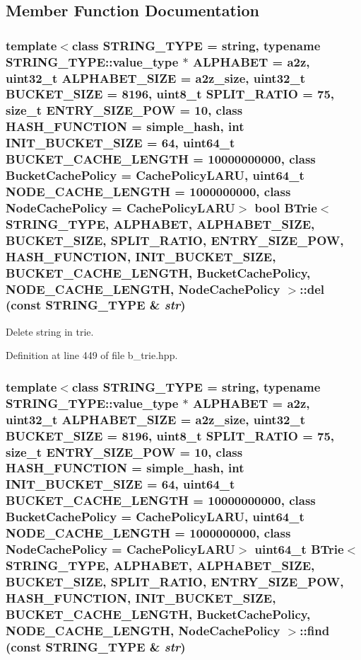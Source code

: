 \subsection{Member Function Documentation}
\hypertarget{classBTrie_8f000cc39b2de657cd7817690437f54d}{
\subsubsection[{del}]{\setlength{\rightskip}{0pt plus 5cm}template$<$class STRING\_\-TYPE  = string, typename STRING\_\-TYPE::value\_\-type $\ast$ ALPHABET = a2z, uint32\_\-t ALPHABET\_\-SIZE = a2z\_\-size, uint32\_\-t BUCKET\_\-SIZE = 8196, uint8\_\-t SPLIT\_\-RATIO = 75, size\_\-t ENTRY\_\-SIZE\_\-POW = 10, class HASH\_\-FUNCTION  = simple\_\-hash, int INIT\_\-BUCKET\_\-SIZE = 64, uint64\_\-t BUCKET\_\-CACHE\_\-LENGTH = 10000000000, class BucketCachePolicy  = CachePolicyLARU, uint64\_\-t NODE\_\-CACHE\_\-LENGTH = 1000000000, class NodeCachePolicy  = CachePolicyLARU$>$ bool {\bf BTrie}$<$ STRING\_\-TYPE, ALPHABET, ALPHABET\_\-SIZE, BUCKET\_\-SIZE, SPLIT\_\-RATIO, ENTRY\_\-SIZE\_\-POW, HASH\_\-FUNCTION, INIT\_\-BUCKET\_\-SIZE, BUCKET\_\-CACHE\_\-LENGTH, BucketCachePolicy, NODE\_\-CACHE\_\-LENGTH, NodeCachePolicy $>$::del (const STRING\_\-TYPE \& {\em str})}}
\label{classBTrie_8f000cc39b2de657cd7817690437f54d}


Delete string in trie. 

Definition at line 449 of file b\_\-trie.hpp.\hypertarget{classBTrie_3c466397db53b56baa0def869f49a1f3}{
\subsubsection[{find}]{\setlength{\rightskip}{0pt plus 5cm}template$<$class STRING\_\-TYPE  = string, typename STRING\_\-TYPE::value\_\-type $\ast$ ALPHABET = a2z, uint32\_\-t ALPHABET\_\-SIZE = a2z\_\-size, uint32\_\-t BUCKET\_\-SIZE = 8196, uint8\_\-t SPLIT\_\-RATIO = 75, size\_\-t ENTRY\_\-SIZE\_\-POW = 10, class HASH\_\-FUNCTION  = simple\_\-hash, int INIT\_\-BUCKET\_\-SIZE = 64, uint64\_\-t BUCKET\_\-CACHE\_\-LENGTH = 10000000000, class BucketCachePolicy  = CachePolicyLARU, uint64\_\-t NODE\_\-CACHE\_\-LENGTH = 1000000000, class NodeCachePolicy  = CachePolicyLARU$>$ uint64\_\-t {\bf BTrie}$<$ STRING\_\-TYPE, ALPHABET, ALPHABET\_\-SIZE, BUCKET\_\-SIZE, SPLIT\_\-RATIO, ENTRY\_\-SIZE\_\-POW, HASH\_\-FUNCTION, INIT\_\-BUCKET\_\-SIZE, BUCKET\_\-CACHE\_\-LENGTH, BucketCachePolicy, NODE\_\-CACHE\_\-LENGTH, NodeCachePolicy $>$::find (const STRING\_\-TYPE \& {\em str})}}
\label{classBTrie_3c466397db53b56baa0def869f49a1f3}


